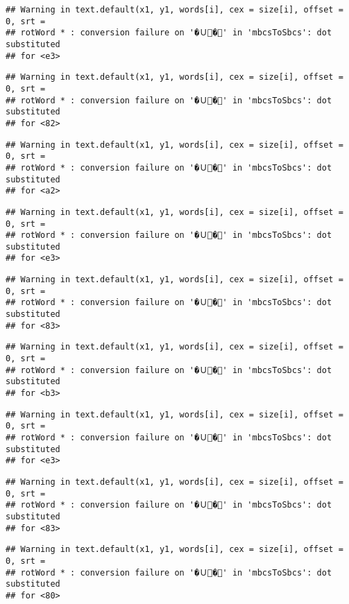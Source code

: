 \documentclass[]{article}
\begin{document}
\begin{verbatim}
## Warning in text.default(x1, y1, words[i], cex = size[i], offset = 0, srt =
## rotWord * : conversion failure on '�Ｕ�' in 'mbcsToSbcs': dot substituted
## for <e3>
\end{verbatim}

\begin{verbatim}
## Warning in text.default(x1, y1, words[i], cex = size[i], offset = 0, srt =
## rotWord * : conversion failure on '�Ｕ�' in 'mbcsToSbcs': dot substituted
## for <82>
\end{verbatim}

\begin{verbatim}
## Warning in text.default(x1, y1, words[i], cex = size[i], offset = 0, srt =
## rotWord * : conversion failure on '�Ｕ�' in 'mbcsToSbcs': dot substituted
## for <a2>
\end{verbatim}

\begin{verbatim}
## Warning in text.default(x1, y1, words[i], cex = size[i], offset = 0, srt =
## rotWord * : conversion failure on '�Ｕ�' in 'mbcsToSbcs': dot substituted
## for <e3>
\end{verbatim}

\begin{verbatim}
## Warning in text.default(x1, y1, words[i], cex = size[i], offset = 0, srt =
## rotWord * : conversion failure on '�Ｕ�' in 'mbcsToSbcs': dot substituted
## for <83>
\end{verbatim}

\begin{verbatim}
## Warning in text.default(x1, y1, words[i], cex = size[i], offset = 0, srt =
## rotWord * : conversion failure on '�Ｕ�' in 'mbcsToSbcs': dot substituted
## for <b3>
\end{verbatim}

\begin{verbatim}
## Warning in text.default(x1, y1, words[i], cex = size[i], offset = 0, srt =
## rotWord * : conversion failure on '�Ｕ�' in 'mbcsToSbcs': dot substituted
## for <e3>
\end{verbatim}

\begin{verbatim}
## Warning in text.default(x1, y1, words[i], cex = size[i], offset = 0, srt =
## rotWord * : conversion failure on '�Ｕ�' in 'mbcsToSbcs': dot substituted
## for <83>
\end{verbatim}

\begin{verbatim}
## Warning in text.default(x1, y1, words[i], cex = size[i], offset = 0, srt =
## rotWord * : conversion failure on '�Ｕ�' in 'mbcsToSbcs': dot substituted
## for <80>
\end{verbatim}
\end{document}
